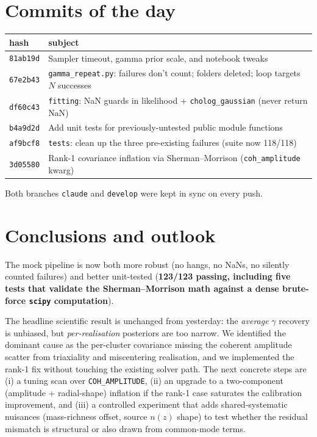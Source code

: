 \documentclass[11pt,a4paper]{article}
\begin{document}
\section{Commits of the day}

\begin{footnotesize}
\begin{tabular}{ll}
\toprule
hash & subject \\
\midrule
\texttt{81ab19d} & Sampler timeout, gamma prior scale, and notebook tweaks \\
\texttt{67e2b43} & \texttt{gamma\_repeat.py}: failures don't count; folders deleted; loop targets $N$ successes \\
\texttt{df60c43} & \texttt{fitting}: NaN guards in likelihood + \texttt{cholog\_gaussian} (never return NaN) \\
\texttt{b4a9d2d} & Add unit tests for previously-untested public module functions \\
\texttt{af9bcf8} & \texttt{tests}: clean up the three pre-existing failures (suite now 118/118) \\
\texttt{3d05580} & Rank-1 covariance inflation via Sherman--Morrison (\texttt{coh\_amplitude} kwarg) \\
\bottomrule
\end{tabular}
\end{footnotesize}

Both branches \texttt{claude} and \texttt{develop} were kept in sync on
every push.

\section*{Conclusions and outlook}

The mock pipeline is now both more robust (no hangs, no NaNs, no silently
counted failures) and better unit-tested (\textbf{123/123 passing,
including five tests that validate the Sherman--Morrison math against a
dense brute-force \texttt{scipy} computation}).

The headline scientific result is unchanged from yesterday: the
\emph{average} $\gamma$ recovery is unbiased, but \emph{per-realisation}
posteriors are too narrow.  We identified the dominant cause as the
per-cluster covariance missing the coherent amplitude scatter from
triaxiality and miscentering realisation, and we implemented the rank-1
fix without touching the existing solver path.  The next concrete steps
are (i) a tuning scan over \texttt{COH\_AMPLITUDE}, (ii) an upgrade to a
two-component (amplitude + radial-shape) inflation if the rank-1 case
saturates the calibration improvement, and (iii) a controlled experiment
that adds shared-systematic nuisances (mass-richness offset, source
$n(z)$ shape) to test whether the residual mismatch is structural or
also drawn from common-mode terms.
\end{document}
